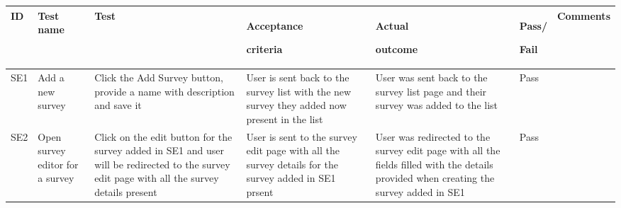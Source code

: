 \begin{longtable}{|p{}|p{}|p{}|p{}|p{}|p{}|p{}|}
  \hline
  ID  & Test name                          & Test                                                                                                                                          & Acceptance \par criteria                                                                                                                                                               & Actual \par outcome                                                                                                                                                       & Pass/\par Fail & Comments\\
  \hline\hline                                                                                                                                                                                                                                                                                                    
  SE1 & Add a new survey                   & Click the Add Survey button, provide a name with description and save it                                                                      & User is sent back to the survey list with the new survey they added now present in the list                                                                                            & User was sent back to the survey list page and their survey was added to the list                                                                                         & Pass           &         \\ 
  \hline                                                                                                                  
  SE2 & Open survey editor for a survey    & Click on the edit button for the survey added in SE1 and user will be redirected to the survey edit page with all the survey details present  & User is sent to the survey edit page with all the survey details for the survey added in SE1 prsent                                                                                    & User was redirected to the survey edit page with all the fields filled with the details provided when creating the survey added in SE1                                    & Pass           &         \\
  \hline                              

\end{longtable}
